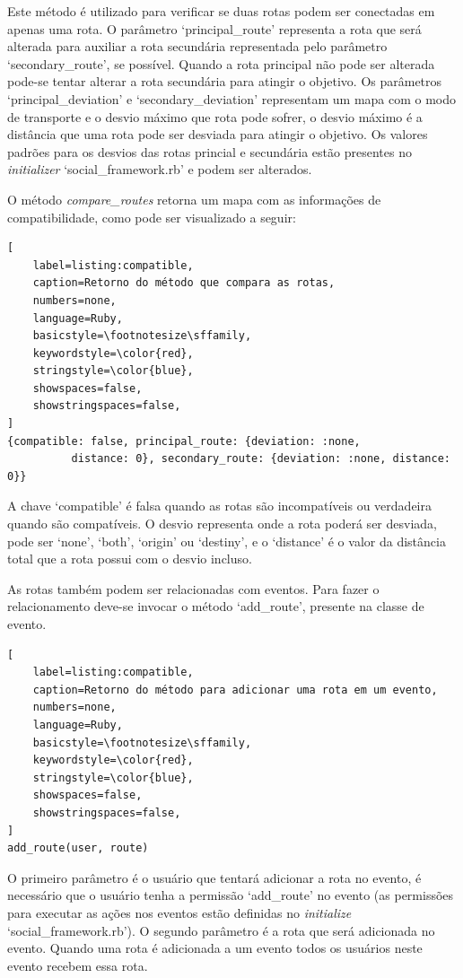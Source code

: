 Este método é utilizado para verificar se duas rotas podem ser conectadas em apenas uma rota. O parâmetro `principal\_route' representa a rota que será alterada para auxiliar a rota secundária representada pelo parâmetro `secondary\_route', se possível. Quando a rota principal não pode ser alterada pode-se tentar alterar a rota secundária para atingir o objetivo. Os parâmetros `principal\_deviation' e `secondary\_deviation' representam um mapa com o modo de transporte e o desvio máximo que rota pode sofrer, o desvio máximo é a distância que uma rota pode ser desviada para atingir o objetivo. Os valores padrões para os desvios das rotas princial e secundária estão presentes no \textit{initializer} `social\_framework.rb' e podem ser alterados.

O método \textit{compare\_routes} retorna um mapa com as informações de compatibilidade, como pode ser visualizado a seguir:

\begin{lstlisting}[
    label=listing:compatible,
    caption=Retorno do método que compara as rotas,
    numbers=none,
    language=Ruby,
    basicstyle=\footnotesize\sffamily,
    keywordstyle=\color{red},
    stringstyle=\color{blue},
    showspaces=false,
    showstringspaces=false,
]
{compatible: false, principal_route: {deviation: :none,
          distance: 0}, secondary_route: {deviation: :none, distance: 0}}
\end{lstlisting}

A chave `compatible' é falsa quando as rotas são incompatíveis ou verdadeira quando são compatíveis. O desvio representa onde a rota poderá ser desviada, pode ser `none', `both', `origin' ou `destiny', e o `distance' é o valor da distância total que a rota possui com o desvio incluso.

As rotas também podem ser relacionadas com eventos. Para fazer o relacionamento deve-se invocar o método `add\_route', presente na classe de evento.

\begin{lstlisting}[
    label=listing:compatible,
    caption=Retorno do método para adicionar uma rota em um evento,
    numbers=none,
    language=Ruby,
    basicstyle=\footnotesize\sffamily,
    keywordstyle=\color{red},
    stringstyle=\color{blue},
    showspaces=false,
    showstringspaces=false,
]
add_route(user, route)
\end{lstlisting}

O primeiro parâmetro é o usuário que tentará adicionar a rota no evento, é necessário que o usuário tenha a permissão `add\_route' no evento (as permissões para executar as ações nos eventos estão definidas no \textit{initialize} `social\_framework.rb'). O segundo parâmetro é a rota que será adicionada no evento. Quando uma rota é adicionada a um evento todos os usuários neste evento recebem essa rota.

